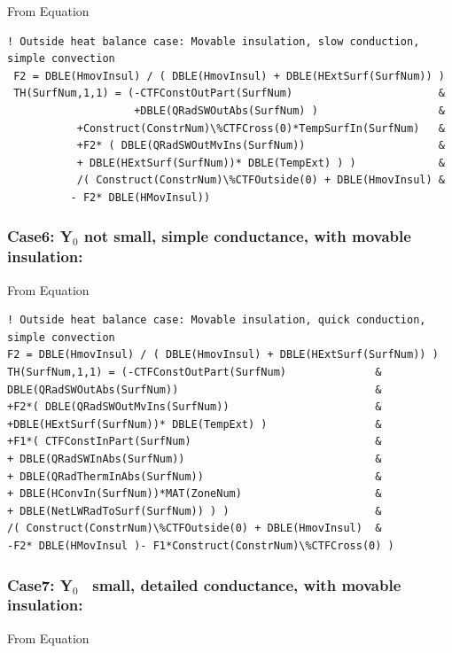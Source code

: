 From Equation

\begin{lstlisting}
! Outside heat balance case: Movable insulation, slow conduction, simple convection
 F2 = DBLE(HmovInsul) / ( DBLE(HmovInsul) + DBLE(HExtSurf(SurfNum)) )
 TH(SurfNum,1,1) = (-CTFConstOutPart(SurfNum)                       &
                    +DBLE(QRadSWOutAbs(SurfNum) )                   &
           +Construct(ConstrNum)\%CTFCross(0)*TempSurfIn(SurfNum)   &
           +F2* ( DBLE(QRadSWOutMvIns(SurfNum))                     &
           + DBLE(HExtSurf(SurfNum))* DBLE(TempExt) ) )             &
           /( Construct(ConstrNum)\%CTFOutside(0) + DBLE(HmovInsul) &
          - F2* DBLE(HMovInsul))
\end{lstlisting}

\subsubsection{Case6: Y\(_{0}\) not small, simple conductance, with movable insulation:}\label{case6-yux5f0-not-small-simple-conductance-with-movable-insulation-1}

From Equation

\begin{lstlisting}
! Outside heat balance case: Movable insulation, quick conduction, simple convection
F2 = DBLE(HmovInsul) / ( DBLE(HmovInsul) + DBLE(HExtSurf(SurfNum)) )
TH(SurfNum,1,1) = (-CTFConstOutPart(SurfNum)              &
DBLE(QRadSWOutAbs(SurfNum))                               &
+F2*( DBLE(QRadSWOutMvIns(SurfNum))                       &
+DBLE(HExtSurf(SurfNum))* DBLE(TempExt) )                 &
+F1*( CTFConstInPart(SurfNum)                             &
+ DBLE(QRadSWInAbs(SurfNum))                              &
+ DBLE(QRadThermInAbs(SurfNum))                           &
+ DBLE(HConvIn(SurfNum))*MAT(ZoneNum)                     &
+ DBLE(NetLWRadToSurf(SurfNum)) ) )                       &
/( Construct(ConstrNum)\%CTFOutside(0) + DBLE(HmovInsul)  &
-F2* DBLE(HMovInsul )- F1*Construct(ConstrNum)\%CTFCross(0) )
\end{lstlisting}

\subsubsection{Case7: Y\(_{0}\)~ small, detailed conductance, with movable insulation:}\label{case7-yux5f0-small-detailed-conductance-with-movable-insulation-1}

From Equation

